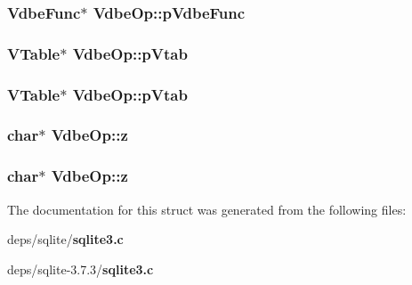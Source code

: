 \subsubsection{\setlength{\rightskip}{0pt plus 5cm}\bf{Vdbe\-Func}$\ast$ \bf{Vdbe\-Op::p\-Vdbe\-Func}}\label{structVdbeOp_c45f7fdcf49c9b5f270e9508c5a81284}


\subsubsection{\setlength{\rightskip}{0pt plus 5cm}\bf{VTable}$\ast$ \bf{Vdbe\-Op::p\-Vtab}}\label{structVdbeOp_bb0c9d8010e5cf6723859131373b8a29}


\subsubsection{\setlength{\rightskip}{0pt plus 5cm}\bf{VTable}$\ast$ \bf{Vdbe\-Op::p\-Vtab}}\label{structVdbeOp_bb0c9d8010e5cf6723859131373b8a29}


\subsubsection{\setlength{\rightskip}{0pt plus 5cm}char$\ast$ \bf{Vdbe\-Op::z}}\label{structVdbeOp_52dcea68a3174a2061e1554b93d44d07}


\subsubsection{\setlength{\rightskip}{0pt plus 5cm}char$\ast$ \bf{Vdbe\-Op::z}}\label{structVdbeOp_52dcea68a3174a2061e1554b93d44d07}




The documentation for this struct was generated from the following files:\begin{CompactItemize}
\item 
deps/sqlite/\bf{sqlite3.c}\item 
deps/sqlite-3.7.3/\bf{sqlite3.c}\end{CompactItemize}
